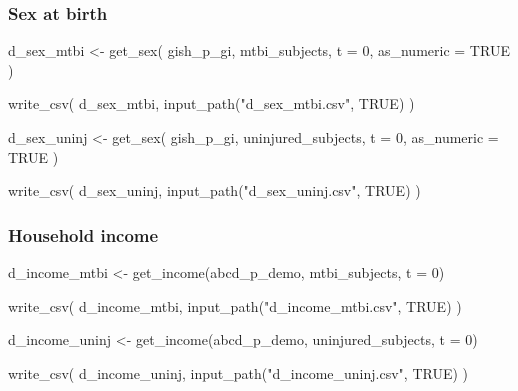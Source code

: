 \documentclass[
  letterpaper,
  DIV=11,
  numbers=noendperiod]{scrreprt}
\newenvironment{Shaded}{\begin{snugshade}}{\end{snugshade}}
\newcommand{\AttributeTok}[1]{\textcolor[rgb]{0.40,0.45,0.13}{#1}}
\newcommand{\ConstantTok}[1]{\textcolor[rgb]{0.56,0.35,0.01}{#1}}
\newcommand{\DecValTok}[1]{\textcolor[rgb]{0.68,0.00,0.00}{#1}}
\newcommand{\FunctionTok}[1]{\textcolor[rgb]{0.28,0.35,0.67}{#1}}
\newcommand{\NormalTok}[1]{\textcolor[rgb]{0.00,0.23,0.31}{#1}}
\newcommand{\OtherTok}[1]{\textcolor[rgb]{0.00,0.23,0.31}{#1}}
\newcommand{\StringTok}[1]{\textcolor[rgb]{0.13,0.47,0.30}{#1}}
\begin{document}
\subsubsection{Sex at birth}\label{sex-at-birth}

\begin{Shaded}
\begin{Highlighting}[]
\NormalTok{d\_sex\_mtbi }\OtherTok{\textless{}{-}} \FunctionTok{get\_sex}\NormalTok{(}
\NormalTok{    gish\_p\_gi,}
\NormalTok{    mtbi\_subjects,}
    \AttributeTok{t =} \DecValTok{0}\NormalTok{,}
    \AttributeTok{as\_numeric =} \ConstantTok{TRUE}
\NormalTok{)}

\FunctionTok{write\_csv}\NormalTok{(}
\NormalTok{    d\_sex\_mtbi,}
    \FunctionTok{input\_path}\NormalTok{(}\StringTok{"d\_sex\_mtbi.csv"}\NormalTok{, }\ConstantTok{TRUE}\NormalTok{)}
\NormalTok{)}

\NormalTok{d\_sex\_uninj }\OtherTok{\textless{}{-}} \FunctionTok{get\_sex}\NormalTok{(}
\NormalTok{    gish\_p\_gi,}
\NormalTok{    uninjured\_subjects,}
    \AttributeTok{t =} \DecValTok{0}\NormalTok{,}
    \AttributeTok{as\_numeric =} \ConstantTok{TRUE}
\NormalTok{)}

\FunctionTok{write\_csv}\NormalTok{(}
\NormalTok{    d\_sex\_uninj,}
    \FunctionTok{input\_path}\NormalTok{(}\StringTok{"d\_sex\_uninj.csv"}\NormalTok{, }\ConstantTok{TRUE}\NormalTok{)}
\NormalTok{)}
\end{Highlighting}
\end{Shaded}

\subsubsection{Household income}\label{household-income}

\begin{Shaded}
\begin{Highlighting}[]
\NormalTok{d\_income\_mtbi }\OtherTok{\textless{}{-}} \FunctionTok{get\_income}\NormalTok{(abcd\_p\_demo, mtbi\_subjects, }\AttributeTok{t =} \DecValTok{0}\NormalTok{)}

\FunctionTok{write\_csv}\NormalTok{(}
\NormalTok{    d\_income\_mtbi,}
    \FunctionTok{input\_path}\NormalTok{(}\StringTok{"d\_income\_mtbi.csv"}\NormalTok{, }\ConstantTok{TRUE}\NormalTok{)}
\NormalTok{)}

\NormalTok{d\_income\_uninj }\OtherTok{\textless{}{-}} \FunctionTok{get\_income}\NormalTok{(abcd\_p\_demo, uninjured\_subjects, }\AttributeTok{t =} \DecValTok{0}\NormalTok{)}

\FunctionTok{write\_csv}\NormalTok{(}
\NormalTok{    d\_income\_uninj,}
    \FunctionTok{input\_path}\NormalTok{(}\StringTok{"d\_income\_uninj.csv"}\NormalTok{, }\ConstantTok{TRUE}\NormalTok{)}
\NormalTok{)}
\end{Highlighting}
\end{Shaded}
\end{document}
